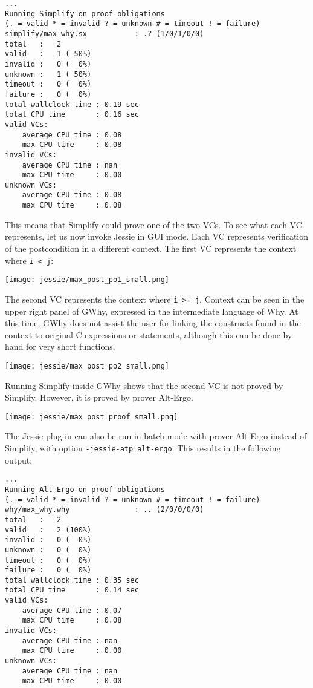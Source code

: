 \documentclass[a4paper,11pt,twoside,openright]{report}
\begin{document}
\begin{verbatim}
...
Running Simplify on proof obligations
(. = valid * = invalid ? = unknown # = timeout ! = failure)
simplify/max_why.sx           : .? (1/0/1/0/0)
total   :   2
valid   :   1 ( 50%)
invalid :   0 (  0%)
unknown :   1 ( 50%)
timeout :   0 (  0%)
failure :   0 (  0%)
total wallclock time : 0.19 sec
total CPU time       : 0.16 sec
valid VCs:
    average CPU time : 0.08
    max CPU time     : 0.08
invalid VCs:
    average CPU time : nan
    max CPU time     : 0.00
unknown VCs:
    average CPU time : 0.08
    max CPU time     : 0.08
\end{verbatim}

This means that Simplify could prove one of the two VCs. To see
what each VC represents, let us now invoke Jessie in GUI
mode. Each VC represents verification of the postcondition in a
different context. The first VC represents the context where
\verb|i < j|:

\begin{center}
  \texttt{[image: jessie/max\_post\_po1\_small.png]}
\end{center}

The second VC represents the context where \verb|i >= j|.  Context can
be seen in the upper right panel of GWhy, expressed in the
intermediate language of Why. At this time, GWhy does not assist
the user for linking the constructs found in the context to 
original C expressions or statements, although this can be done
by hand for very short functions.

\begin{center}
  \texttt{[image: jessie/max\_post\_po2\_small.png]}
\end{center}

Running Simplify inside GWhy shows that the second VC is not proved by
Simplify. However, it is proved by prover Alt-Ergo.

\begin{center}
  \texttt{[image: jessie/max\_post\_proof\_small.png]}
\end{center}

The Jessie plug-in can also be run in batch mode with prover Alt-Ergo
instead of Simplify, with option \verb|-jessie-atp alt-ergo|. This
results in the following output:

\begin{verbatim}
...
Running Alt-Ergo on proof obligations
(. = valid * = invalid ? = unknown # = timeout ! = failure)
why/max_why.why               : .. (2/0/0/0/0)
total   :   2
valid   :   2 (100%)
invalid :   0 (  0%)
unknown :   0 (  0%)
timeout :   0 (  0%)
failure :   0 (  0%)
total wallclock time : 0.35 sec
total CPU time       : 0.14 sec
valid VCs:
    average CPU time : 0.07
    max CPU time     : 0.08
invalid VCs:
    average CPU time : nan
    max CPU time     : 0.00
unknown VCs:
    average CPU time : nan
    max CPU time     : 0.00
\end{verbatim}
\end{document}
